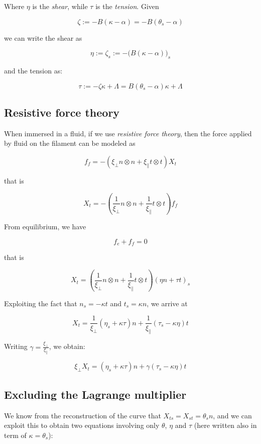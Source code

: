 Where \(\eta\) is the \emph{shear}, while $\tau$ is the
\emph{tension}. Given 

\[\zeta := -B(\kappa - \alpha) = -B(\theta_s - \alpha)\]

we can write the shear as

\[\eta := \zeta_s := -\big( B(\kappa - \alpha) \big)_s\]

and the tension as:

\[\tau := -\zeta\kappa + \Lambda = B(\theta_s-\alpha)\kappa +\Lambda\]

\subsection{Resistive force theory}
\label{sec:resist-force-theory}



When immersed in a fluid, if we use \emph{resistive force theory},
then the force applied by fluid on the filament can be modeled as

\[f_f = -( \xi_\perp n\otimes n +\xi_\parallel t\otimes t) X_t\]

that is

\[X_t = -\left( \frac{1}{\xi_\perp}  n\otimes n + \frac{1}{\xi_\parallel} t\otimes t\right) f_f\]

From equilibrium, we have

\[f_e+f_f = 0\]

that is

\[X_t = \left( \frac{1}{\xi_\perp}  n\otimes n + \frac{1}{\xi_\parallel} t\otimes t\right) (\eta n + \tau t)_s\]

Exploiting the fact that \(n_s = - \kappa t\) and \(t_s = \kappa n\), we
arrive at

\[X_t =  \frac{1}{\xi_\perp} (\eta_s + \kappa \tau) n + \frac{1}{\xi_\parallel}(\tau_s - \kappa \eta) t\]

Writing $\gamma = \frac{\xi_\perp}{\xi_\parallel}$, we obtain:

\[\xi_\perp X_t =   (\eta_s + \kappa \tau) n + \gamma (\tau_s - \kappa \eta) t\]

\subsection{Excluding the Lagrange multiplier}\label{differential-derivation}

We know from the reconstruction of the curve that
\(X_{ts} = X_{st} = \theta_s n\),
and we can exploit this to obtain two equations involving only
\(\theta\),
\(\eta\)
and \(\tau\) (here written also in term of $\kappa = \theta_s$):

